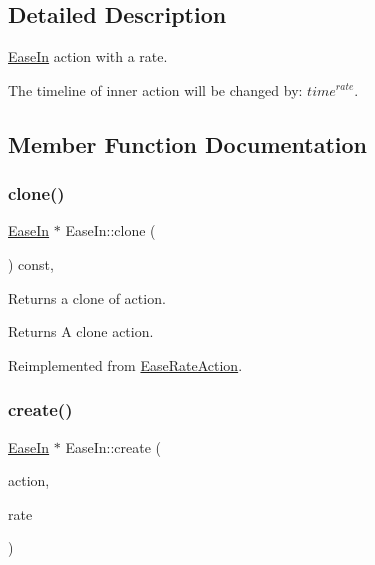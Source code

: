 \subsection{Detailed Description}
\hyperlink{classEaseIn}{Ease\+In} action with a rate. 

The timeline of inner action will be changed by\+: ${ time }^{ rate }$. 

\subsection{Member Function Documentation}
\mbox{\label{classEaseIn_ac2db345fad4b62fa8485e6d40121a83c}} 
\subsubsection{\texorpdfstring{clone()}{clone()}}
{\footnotesize\ttfamily \hyperlink{classEaseIn}{Ease\+In} $\ast$ Ease\+In\+::clone (\begin{DoxyParamCaption}\item[{void}]{ }\end{DoxyParamCaption}) const\hspace{0.3cm}{\ttfamily [override]}, {\ttfamily [virtual]}}

Returns a clone of action.

\begin{DoxyReturn}{Returns}
A clone action. 
\end{DoxyReturn}


Reimplemented from \hyperlink{classEaseRateAction_a50323a94f7587203d7b02bb66fe2e67e}{Ease\+Rate\+Action}.

\mbox{\label{classEaseIn_a242a4605c0fcbcd78ba7a2f5e9962116}} 
\subsubsection{\texorpdfstring{create()}{create()}}
{\footnotesize\ttfamily \hyperlink{classEaseIn}{Ease\+In} $\ast$ Ease\+In\+::create (\begin{DoxyParamCaption}\item[{\hyperlink{classActionInterval}{Action\+Interval} $\ast$}]{action,  }\item[{float}]{rate }\end{DoxyParamCaption})\hspace{0.3cm}{\ttfamily [static]}}




